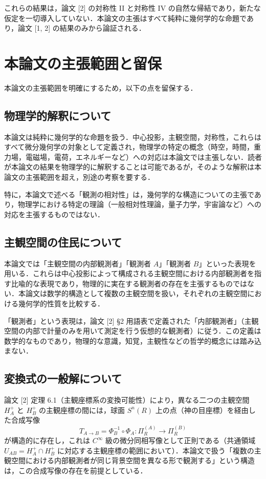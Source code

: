 \documentclass[a4paper,11pt]{ltjsarticle}
\theoremstyle{definition}
\begin{document}
これらの結果は，論文 {[2]} の対称性 II と対称性 IV の自然な帰結であり，新たな仮定を一切導入していない．本論文の主張はすべて純粋に幾何学的な命題であり，論文 {[1, 2]} の結果のみから論証される．

\section{本論文の主張範囲と留保}

本論文の主張範囲を明確にするため，以下の点を留保する．

\subsection{物理学的解釈について}

本論文は純粋に幾何学的な命題を扱う．中心投影，主観空間，対称性，これらはすべて微分幾何学の対象として定義され，物理学の特定の概念（時空，時間，重力場，電磁場，電荷，エネルギーなど）への対応は本論文では主張しない．読者が本論文の結果を物理学的に解釈することは可能であるが，そのような解釈は本論文の主張範囲を超え，別途の考察を要する．

特に，本論文で述べる「観測の相対性」は，幾何学的な構造についての主張であり，物理学における特定の理論（一般相対性理論，量子力学，宇宙論など）への対応を主張するものではない．

\subsection{主観空間の住民について}

本論文では「主観空間の内部観測者」「観測者 \(A\)」「観測者 \(B\)」といった表現を用いる．これらは中心投影によって構成される主観空間における内部観測者を指す比喩的な表現であり，物理的に実在する観測者の存在を主張するものではない．本論文は数学的構造として複数の主観空間を扱い，それぞれの主観空間における幾何学的性質を比較する．

「観測者」という表現は，論文 {[2]} \S2 用語表で定義された「内部観測者」（主観空間の内部で計量のみを用いて測定を行う仮想的な観測者）に従う．この定義は数学的なものであり，物理的な意識，知覚，主観性などの哲学的概念には踏み込まない．

\subsection{変換式の一般解について}

論文 {[2]} 定理 6.1（主観座標系の変換可能性）により，異なる二つの主観空間 \(H_A^+\) と \(H_B^+\) の主観座標の間には，球面 \(S^n(R)\) 上の点（神の目座標）を経由した合成写像
\[
T_{A \to B} = \Phi_B^{-1} \circ \Phi_A : \Pi_R^{(A)} \to \Pi_R^{(B)}
\]
が構造的に存在し，これは \(C^\infty\) 級の微分同相写像として正則である（共通領域 \(U_{AB} = H_A^+ \cap H_B^+\) に対応する主観座標の範囲において）．本論文で扱う「複数の主観空間における内部観測者が同じ背景空間を異なる形で観測する」という構造は，この合成写像の存在を前提としている．
\end{document}
